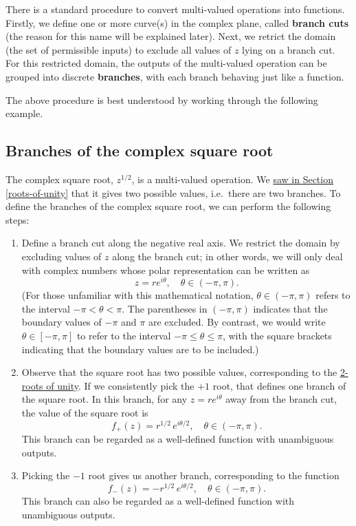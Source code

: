 \documentclass[10pt,a4paper]{article}
\begin{document}
There is a standard procedure to convert multi-valued operations into
functions. Firstly, we define one or more curve(s) in the complex
plane, called \textbf{branch cuts} (the reason for this name will be
explained later). Next, we retrict the domain (the set of permissible
inputs) to exclude all values of $z$ lying on a branch cut. For this
restricted domain, the outputs of the multi-valued operation can be
grouped into discrete \textbf{branches}, with each branch behaving
just like a function.

The above procedure is best understood by working through the
following example.

\subsection{Branches of the complex square root}
\label{branches-of-the-complex-square-root}

The complex square root, $z^{1/2}$, is a multi-valued operation.  We
\hyperref[square-root-example]{saw in Section \ref{roots-of-unity}}
that it gives two possible values, i.e.~there are two branches. To
define the branches of the complex square root, we can perform the
following steps:

\begin{enumerate}
\item
Define a branch cut along the negative real axis. We restrict the
domain by excluding values of $z$ along the branch cut; in other
words, we will only deal with complex numbers whose polar
representation can be written as
\begin{equation}
z = r e^{i\theta}, \quad \theta \in (-\pi, \pi).
\end{equation}
(For those unfamiliar with this mathematical notation,
$\theta \in (-\pi, \pi)$ refers to the interval
$-\pi < \theta < \pi$. The parentheses in $(-\pi, \pi)$ indicates
that the boundary values of $-\pi$ and $\pi$ are excluded. By
contrast, we would write $\theta \in [-\pi, \pi]$ to refer to the
interval $-\pi \le \theta \le \pi$, with the square brackets
indicating that the boundary values are to be included.)

\item
Observe that the square root has two possible values, corresponding to
the \hyperref[roots-of-unity]{2-roots of unity}. If we consistently
pick the $+1$ root, that defines one branch of the square root. In
this branch, for any $z = re^{i\theta}$ away from the branch cut, the
value of the square root is
\begin{equation}
  f_+(z) = r^{1/2} \, e^{i\theta/2}, \quad \theta \in (-\pi, \pi).
\end{equation}
This branch can be regarded as a well-defined function with
unambiguous outputs.

\item
Picking the $-1$ root gives us another branch, corresponding to the
function
\begin{equation}
f_-(z) = -r^{1/2} \, e^{i\theta/2}, \quad \theta \in (-\pi, \pi).
\end{equation}
This branch can also be regarded as a well-defined function with
unambiguous outputs.
\end{enumerate}
\end{document}
